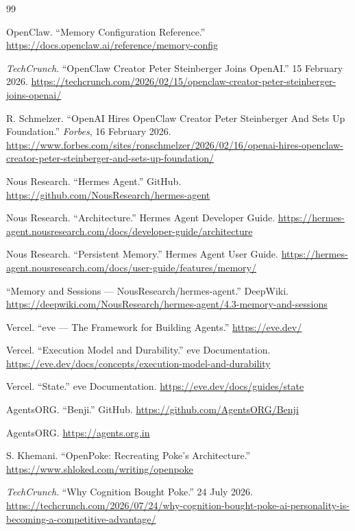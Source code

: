 \documentclass[11pt,a4paper]{article}
\begin{document}
\begin{thebibliography}{99}
{ OpenClaw. ``Memory Configuration Reference.''
\url{https://docs.openclaw.ai/reference/memory-config}

 \emph{TechCrunch}. ``OpenClaw Creator Peter
Steinberger Joins OpenAI.'' 15 February 2026.
\url{https://techcrunch.com/2026/02/15/openclaw-creator-peter-steinberger-joins-openai/}

 R. Schmelzer. ``OpenAI Hires OpenClaw Creator
Peter Steinberger And Sets Up Foundation.'' \emph{Forbes}, 16 February
2026.
\url{https://www.forbes.com/sites/ronschmelzer/2026/02/16/openai-hires-openclaw-creator-peter-steinberger-and-sets-up-foundation/}

 Nous Research. ``Hermes Agent.'' GitHub.
\url{https://github.com/NousResearch/hermes-agent}

 Nous Research. ``Architecture.'' Hermes Agent
Developer Guide.
\url{https://hermes-agent.nousresearch.com/docs/developer-guide/architecture}

 Nous Research. ``Persistent Memory.'' Hermes Agent
User Guide.
\url{https://hermes-agent.nousresearch.com/docs/user-guide/features/memory/}

 ``Memory and Sessions --- NousResearch/hermes-agent.''
DeepWiki.
\url{https://deepwiki.com/NousResearch/hermes-agent/4.3-memory-and-sessions}

 Vercel. ``eve --- The Framework for Building Agents.''
\url{https://eve.dev/}

 Vercel. ``Execution Model and Durability.'' eve
Documentation.
\url{https://eve.dev/docs/concepts/execution-model-and-durability}

 Vercel. ``State.'' eve Documentation.
\url{https://eve.dev/docs/guides/state}

 AgentsORG. ``Benji.'' GitHub.
\url{https://github.com/AgentsORG/Benji}

 AgentsORG. \url{https://agents.org.in}

 S. Khemani. ``OpenPoke: Recreating Poke's
Architecture.'' \url{https://www.shloked.com/writing/openpoke}

 \emph{TechCrunch}. ``Why Cognition Bought Poke.''
24 July 2026.
\url{https://techcrunch.com/2026/07/24/why-cognition-bought-poke-ai-personality-is-becoming-a-competitive-advantage/}

}
\end{thebibliography}
\end{document}
